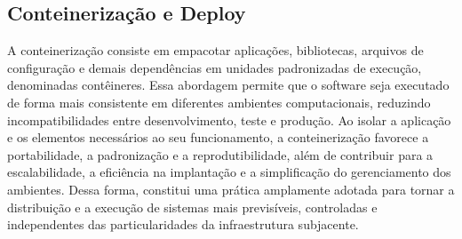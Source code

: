 \subsection{Conteinerização e Deploy }

A conteinerização consiste em empacotar aplicações, bibliotecas, arquivos de configuração e demais dependências em unidades padronizadas de execução, denominadas contêineres. Essa abordagem permite que o software seja executado de forma mais consistente em diferentes ambientes computacionais, reduzindo incompatibilidades entre desenvolvimento, teste e produção. Ao isolar a aplicação e os elementos necessários ao seu funcionamento, a conteinerização favorece a portabilidade, a padronização e a reprodutibilidade, além de contribuir para a escalabilidade, a eficiência na implantação e a simplificação do gerenciamento dos ambientes. Dessa forma, constitui uma prática amplamente adotada para tornar a distribuição e a execução de sistemas mais previsíveis, controladas e independentes das particularidades da infraestrutura subjacente.